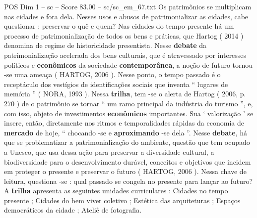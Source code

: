 \begin{textsample}{POS Dim 1 – sc – Score 83.00 – sc/sc\_em\_67.txt}
Os patrimônios se multiplicam nas cidades e fora dela.
Nesses usos e abusos de patrimonializar as cidades, cabe questionar : preservar o quê e quem?
Nas cidades do tempo presente há um processo de patrimonialização de todos os bens e práticas, que Hartog ( 2014 ) denomina de regime de historicidade presentista.
Nesse \textbf{debate} da patrimonialização acelerada dos bens culturais, que é atravessado por interesses políticos e \textbf{econômicos} da sociedade \textbf{contemporânea}, a noção de futuro tornou -se uma ameaça ( HARTOG, 2006 ).
Nesse ponto, o tempo passado é o receptáculo dos vestígios de identificações sociais que inventa “ lugares de memória ” ( NORA, 1993 ).
Nessa \textbf{trilha}, tem -se o alerta de Hartog ( 2006, p. 270 ) de o patrimônio se tornar “ um ramo principal da indústria do turismo ”, e, com isso, objeto de investimentos \textbf{econômicos} importantes.
Sua ‘ valorização ’ se insere, então, diretamente nos ritmos e temporalidades rápidas da economia de \textbf{mercado} de hoje, “ chocando -se e \textbf{aproximando} -se dela ”.
Nesse \textbf{debate}, há que se problematizar a patrimonialização do ambiente, questão que tem ocupado a Unesco, que usa dessa ação para preservar a diversidade cultural, a biodiversidade para o desenvolvimento durável, conceitos e objetivos que incidem em proteger o presente e preservar o futuro ( HARTOG, 2006 ).
Nessa chave de leitura, questiona -se : qual passado se congela no presente para lançar ao futuro?
A \textbf{trilha} apresenta as seguintes unidades curriculares : Cidades no tempo presente ; Cidades do bem viver coletivo ; Estética das arquiteturas ; Espaços democráticos da cidade ; Ateliê de fotografia.

\end{textsample}

